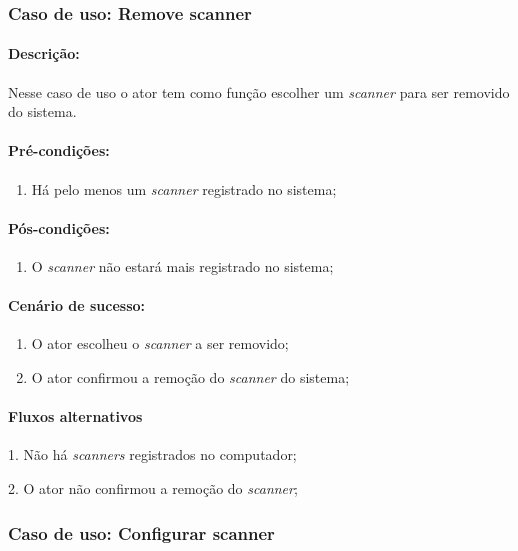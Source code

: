 \newpage
\subsubsection{Caso de uso: Remove scanner}

\paragraph{Descrição:} Nesse caso de uso o ator tem como função escolher um {\it scanner} para ser removido do sistema.

\paragraph{Pré-condições:}
\begin{enumerate}
    \item Há pelo menos um {\it scanner} registrado no sistema;
\end{enumerate}

\paragraph{Pós-condições:} 
\begin{enumerate}
    \item O {\it scanner} não estará mais registrado no sistema;
\end{enumerate}

\paragraph{Cenário de sucesso:}
\begin{enumerate}
    \item O ator escolheu o  {\it scanner} a ser removido;
    \item O ator confirmou a remoção do {\it scanner} do sistema;
\end{enumerate}

\paragraph{Fluxos alternativos}
\begin{description}
    \item 1. Não há {\it scanners} registrados no computador; 
    \item 2. O ator não confirmou a remoção do {\it scanner};
\end{description}

\newpage
\subsubsection{Caso de uso: Configurar scanner}

